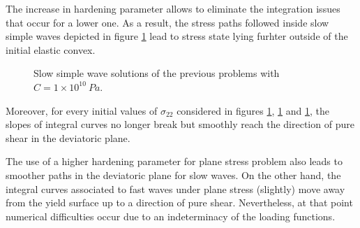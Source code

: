 The increase in hardening parameter allows to eliminate the integration issues that occur for a lower one.
As a result, the stress paths followed inside slow simple waves depicted in figure \ref{fig:slow_H} lead to stress state lying furhter outside of the initial elastic convex.
\begin{figure}[h!]
  \centering
  { \label{subfig:slow_H1}}
  { \label{subfig:slow_H2}}
  { \label{subfig:slow_H3}}
  
  \caption{Slow simple wave solutions of the previous problems with $C=1\times10^{10} \: Pa$.}
  \label{fig:slow_H}
\end{figure}
Moreover, for every initial values of $\sigma_{22}$ considered in figures \ref{fig:slow_H}, \ref{fig:slow_H} and \ref{fig:slow_H}, the slopes of integral curves no longer break but smoothly reach the direction of pure shear in the deviatoric plane.

\begin{remark}
  The use of a higher hardening parameter for plane stress problem also leads to smoother paths in the deviatoric plane for slow waves.
  On the other hand, the integral curves associated to fast waves under plane stress (slightly) move away from the yield surface up to a direction of pure shear.
  Nevertheless, at that point numerical difficulties occur due to an indeterminacy of the loading functions.
\end{remark}


